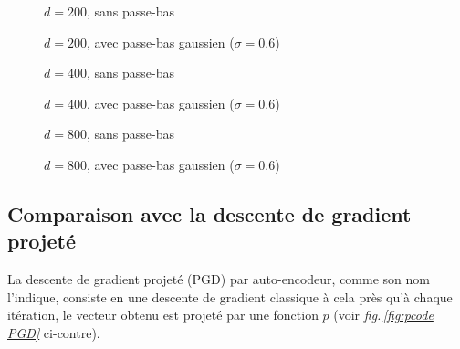 \documentclass[hidelinks, french]{article} %
\newcommand{\figref}[1]{\textit{fig.\,\ref{#1}}}
\theoremstyle{enonce}
\theoremstyle{special}
\theoremstyle{rq}
\theoremstyle{exo}
\theoremstyle{demo}
\begin{document}
\begin{figure}[H]\centering
	
	\caption{$d=200$, sans passe-bas}
	\label{fig:LGDlat200-s}
\end{figure}

\begin{figure}[H]\centering
	
	\caption{$d=200$, avec passe-bas gaussien ($\sigma=0.6$)}
	\label{fig:LGDlat200-g}
\end{figure}

\begin{figure}[H]\centering
	
	\caption{$d=400$, sans passe-bas}
	\label{fig:LGDlat400-s}
\end{figure}

\begin{figure}[H]\centering
	
	\caption{$d=400$, avec passe-bas gaussien ($\sigma=0.6$)}
	\label{fig:LGDlat400-g}
\end{figure}

\begin{figure}[H]\centering
	
	\caption{$d=800$, sans passe-bas}
	\label{fig:LGDlat800-s}
\end{figure}

\begin{figure}[H]\centering
	
	\caption{$d=800$, avec passe-bas gaussien ($\sigma=0.6$)}
	\label{fig:LGDlat800-g}
\end{figure}





\newpage



\subsection{Comparaison avec la descente de gradient projeté}\label{sec:PGD}
\quad

La descente de gradient projeté (PGD) par auto-encodeur, comme son nom l'indique, consiste en une descente de gradient classique à cela près qu'à chaque itération, le vecteur obtenu est projeté par une fonction $p$ (voir \figref{fig:pcode PGD} ci-contre).
\end{document}
